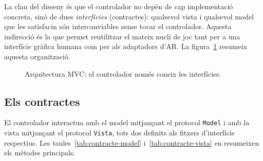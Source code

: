 La clau del disseny és que el controlador no depèn de cap implementació concreta,
sinó de dues \emph{interfícies} (contractes): qualsevol vista i qualsevol model que
les satisfacin són intercanviables sense tocar el controlador. Aquesta indirecció és
la que permet reutilitzar el mateix nucli de joc tant per a una interfície gràfica
humana com per als adaptadors d'\ac{AR}. La figura~\ref{fig:mvc} resumeix aquesta
organització.

\begin{figure}[H]
  \centering
  \caption{Arquitectura \acs{MVC}: el controlador només coneix les interfícies.}
  \label{fig:mvc}
\end{figure}

\subsection*{Els contractes}

El controlador interactua amb el model mitjançant el protocol \texttt{Model}
i amb la vista mitjançant el protocol \texttt{Vista}, tots dos definits als
fitxers d'interfície respectius. Les taules~\ref{tab:contracte-model}
i~\ref{tab:contracte-vista} en resumeixen els mètodes principals.


